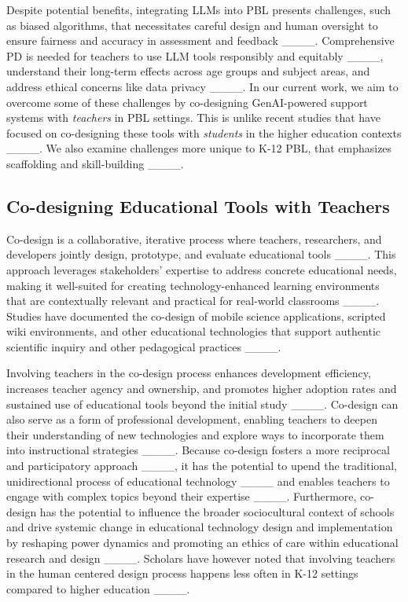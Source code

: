 Despite potential benefits, integrating LLMs into PBL presents challenges, such as biased algorithms, that necessitates careful design and human oversight to ensure fairness and accuracy in assessment and feedback ____. Comprehensive PD is needed for teachers to use LLM tools responsibly and equitably ____, understand
their long-term effects across age groups and subject areas, and address ethical concerns like data privacy ____. In our current work, we aim to overcome some of these challenges by co-designing GenAI-powered support systems with \textit{teachers} in PBL settings. {
This is unlike recent studies that have focused on co-designing these tools with \textit{students} in the higher education contexts ____. We also examine challenges more unique to K-12 PBL, that emphasizes scaffolding and skill-building ____.} 

\subsection{Co-designing Educational Tools with Teachers}

Co-design is a collaborative, iterative process where teachers, researchers, and developers jointly design, prototype, and evaluate educational tools %
____. This approach leverages stakeholders' expertise to address concrete educational needs, making it well-suited for creating technology-enhanced learning environments that are contextually relevant and practical for real-world classrooms ____. Studies have documented the co-design of mobile science applications, scripted wiki environments, and other educational technologies that support authentic scientific inquiry and other pedagogical practices ____.

Involving teachers in the co-design process enhances development efficiency, increases teacher agency and ownership, and promotes higher adoption rates and sustained use of educational tools beyond the initial study ____. %
Co-design can also serve as a form of professional development, enabling teachers to deepen their understanding of new technologies and explore ways to incorporate them into instructional strategies ____. Because co-design fosters a more reciprocal and participatory approach {____}, it has the potential to upend the traditional, unidirectional process of educational technology  ____ and enables teachers to engage with complex topics beyond their expertise ____. %
Furthermore, co-design has the potential to influence the broader sociocultural context of schools and drive systemic change in educational technology design and implementation by reshaping power dynamics and promoting an ethics of care within educational research and design ____. {Scholars have however noted that involving teachers in the human centered design process happens less often in K-12 settings compared to higher education ____.}


